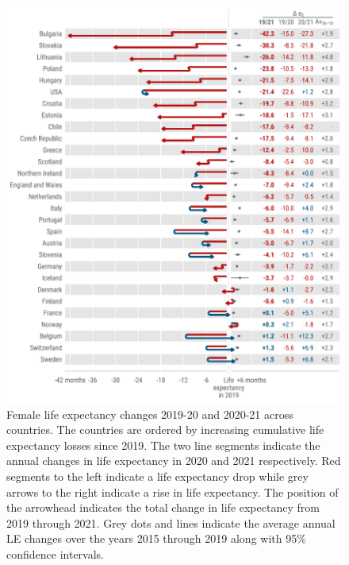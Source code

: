 \documentclass[12pt]{article}
\begin{document}
\begin{figure}[hb!]
    \centering
    \includegraphics{figure-a4.pdf}
    \caption{Female life expectancy changes 2019-20 and 2020-21 across countries. The countries are ordered by increasing cumulative life expectancy losses since 2019. The two line segments indicate the annual changes in life expectancy in 2020 and 2021 respectively. Red segments to the left indicate a life expectancy drop while grey arrows to the right indicate a rise in life expectancy. The position of the arrowhead indicates the total change in life expectancy from 2019 through 2021.
    Grey dots and lines indicate the average annual LE changes over the years 2015 through 2019 along with 95\% confidence intervals.}
    \label{fig:figure-a4}
\end{figure}
\end{document}
